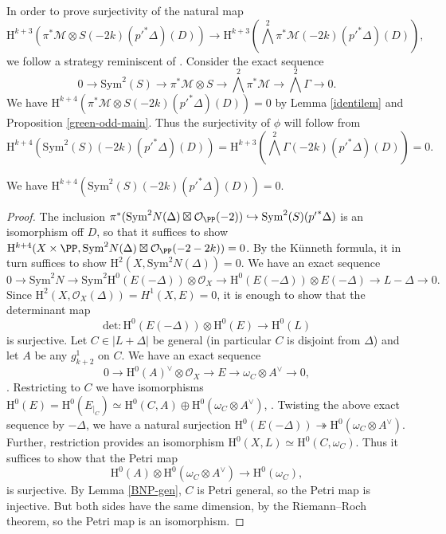 In order to prove surjectivity of the natural map $$\mathrm{H}^{k+3}(\pi^* \mathcal{M} \otimes S(-2k)({p'}^*\Delta)(D)) \to \mathrm{H}^{k+3}(\bigwedge^{2}\pi^*\mathcal{M}(-2k)({p'}^*\Delta)(D)),$$ we follow a strategy reminiscent of \cite[\S 3, Fourth step]{V2}. Consider the exact sequence
$$0 \to \mathrm{Sym}^2(S) \to \pi^*\mathcal{M} \otimes S \to \bigwedge^2 \pi^*\mathcal{M} \to \bigwedge^2 \Gamma \to 0.$$
We have $\mathrm{H}^{k+4}(\pi^* \mathcal{M} \otimes S(-2k)({p'}^*\Delta)(D))=0$ by Lemma \ref{identilem} and Proposition \ref{green-odd-main}. Thus the surjectivity of $\phi$ will follow from
$$\mathrm{H}^{k+4}(\mathrm{Sym}^2(S)(-2k)({p'}^*\Delta)(D))=\mathrm{H}^{k+3}(\bigwedge^2\Gamma (-2k)({p'}^*\Delta)(D))=0.$$
\begin{lem}
\notready
We have $\mathrm{H}^{k+4}(\mathrm{Sym}^2(S)(-2k)({p'}^*\Delta)(D))=0$.
\end{lem}
\begin{proof}
The inclusion $\pi^*( \mathrm{Sym}^{2}N(\Delta) \boxtimes \mathcal{O}_{\PP}(-2)) \hookrightarrow \mathrm{Sym}^{2}(S)({p'}^*\Delta)$ is an isomorphism off $D$, so that it suffices to show $\mathrm{H}^{k+4}(X \times \PP, \mathrm{Sym}^{2}N(\Delta) \boxtimes \mathcal{O}_{\PP}(-2-2k))=0$. By the K\"unneth formula, it in turn suffices to show $\mathrm{H}^2(X,\mathrm{Sym}^{2}N(\Delta))=0$. We have an exact sequence
$$0 \to  \mathrm{Sym}^2N \to \mathrm{Sym}^2 \mathrm{H}^0(E(-\Delta)) \otimes \mathcal{O}_X \to \mathrm{H}^0(E(-\Delta)) \otimes E(-\Delta) \to L-\Delta \to 0.$$
Since $\mathrm{H}^2(X,\mathcal{O}_X(\Delta))=H^1(X,E)=0$, it is enough to show that the determinant map
$$\mathrm{det} : \mathrm{H}^0(E(-\Delta)) \otimes \mathrm{H}^0(E) \to \mathrm{H}^0(L)$$
is surjective. Let $C \in |L+\Delta|$ be general (in particular $C$ is disjoint from $\Delta$) and let $A$ be any $g^1_{k+2}$ on $C$. We have an exact sequence
$$0 \to \mathrm{H}^0(A)^{\vee} \otimes \mathcal{O}_X \to E \to \omega_C \otimes A^{\vee} \to 0,$$
\cite{lazarsfeld-BNP}. Restricting to $C$ we have isomorphisms $\mathrm{H}^0(E)=\mathrm{H}^0(E_{|_C})\simeq \mathrm{H}^0(C,A)\oplus \mathrm{H}^0(\omega_C \otimes A^{\vee})$, \cite{voisin-wahl}. Twisting the above exact sequence by $-\Delta$, we have a natural surjection $\mathrm{H}^0(E(-\Delta)) \twoheadrightarrow \mathrm{H}^0(\omega_C \otimes A^{\vee})$. Further, restriction provides an isomorphism $\mathrm{H}^0(X,L) \simeq \mathrm{H}^0(C,\omega_C)$. Thus it suffices to show that the Petri map
$$\mathrm{H}^0(A) \otimes \mathrm{H}^0(\omega_C \otimes A^{\vee}) \to \mathrm{H}^0(\omega_C),$$
is surjective. By Lemma \ref{BNP-gen}, $C$ is Petri general, so the Petri map is injective. But both sides have the same dimension, by the Riemann--Roch theorem, so the Petri map is an isomorphism.

\end{proof}
